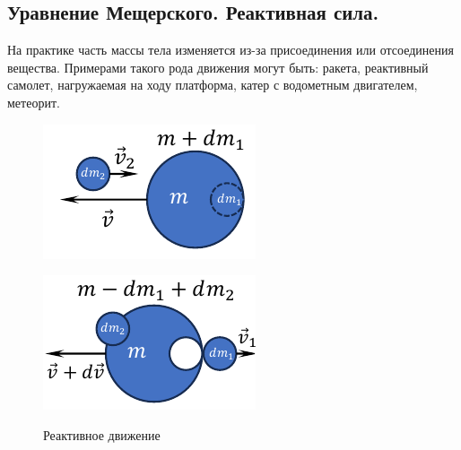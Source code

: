 \subsection{Уравнение Мещерского. Реактивная сила.}

На практике часть массы тела изменяется из-за присоединения или отсоединения вещества. Примерами такого рода движения могут быть: ракета, реактивный самолет, нагружаемая на ходу платформа, катер с водометным двигателем, метеорит.


\begin{figure}[h]
	\centering
	\begin{minipage}{0.49\linewidth}
		\centering
		\includegraphics[width=0.9\linewidth]{image/Реактивное движение 2.pdf}
		\subcaption{ }
		\label{fig:3.1.1}
	\end{minipage}
	\hfill
	\begin{minipage}{0.49\linewidth}
		\centering
		\includegraphics[width=0.9\linewidth]{image/Реактивное движение 1.pdf}
		\subcaption{ }
		\label{fig:3.1.2}
	\end{minipage}
	\caption{Реактивное движение}
	\label{fig:4}
\end{figure}

